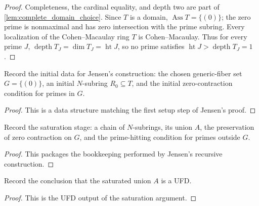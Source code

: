\begin{proof}
  Completeness, the cardinal equality, and depth two are part of
  \cref{lem:complete_domain_choice}.  Since \(T\) is a domain,
  \(\operatorname{Ass}T=\{(0)\}\); the zero prime is nonmaximal and has zero
  intersection with the prime subring.  Every localization of the
  Cohen--Macaulay ring \(T\) is Cohen--Macaulay.  Thus for every prime \(J\),
  \(\operatorname{depth}T_J=\dim T_J=\operatorname{ht}J\), so no prime
  satisfies \(\operatorname{ht}J>\operatorname{depth}T_J=1\).
\end{proof}

\begin{definition}
  \label{def:jensen_n_subring_seed_data}
  Record the initial data for Jensen's construction: the chosen generic-fiber
  set \(G=\{(0)\}\), an initial \(N\)-subring \(R_0\subseteq T\), and the
  initial zero-contraction condition for primes in \(G\).
\end{definition}

\begin{proof}
  This is a data structure matching the first setup step of Jensen's proof.
\end{proof}

\begin{definition}
  \label{def:jensen_saturation_data}
  Record the saturation stage: a chain of \(N\)-subrings, its union \(A\), the
  preservation of zero contraction on \(G\), and the prime-hitting condition for
  primes outside \(G\).
\end{definition}

\begin{proof}
  This packages the bookkeeping performed by Jensen's recursive construction.
\end{proof}

\begin{definition}
  \label{def:jensen_ufd_output_data}
  Record the conclusion that the saturated union \(A\) is a UFD.
\end{definition}

\begin{proof}
  This is the UFD output of the saturation argument.
\end{proof}

